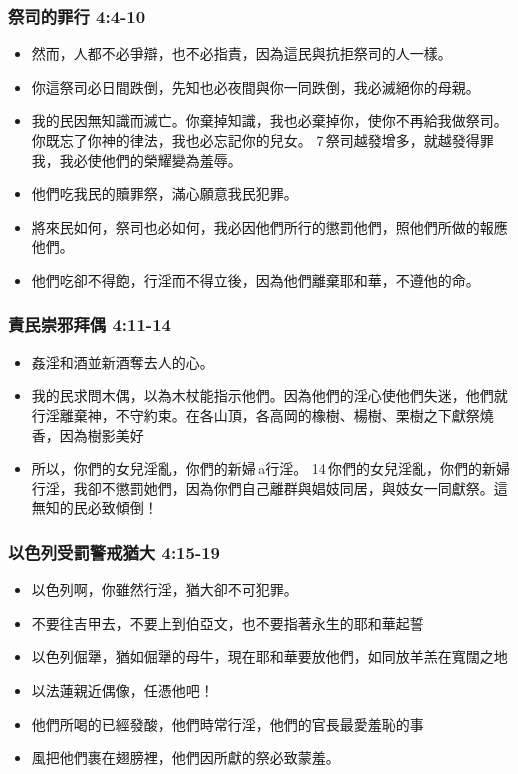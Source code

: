 \subsubsection{祭司的罪行 4:4-10}
\begin{itemize}
\itemsep-.45em  
\item 然而，人都不必爭辯，也不必指責，因為這民與抗拒祭司的人一樣。
\item 你這祭司必日間跌倒，先知也必夜間與你一同跌倒，我必滅絕你的母親。
\item 我的民因無知識而滅亡。你棄掉知識，我也必棄掉你，使你不再給我做祭司。你既忘了你神的律法，我也必忘記你的兒女。 7 祭司越發增多，就越發得罪我，我必使他們的榮耀變為羞辱。
\item 他們吃我民的贖罪祭，滿心願意我民犯罪。
\item 將來民如何，祭司也必如何，我必因他們所行的懲罰他們，照他們所做的報應他們。
\item 他們吃卻不得飽，行淫而不得立後，因為他們離棄耶和華，不遵他的命。
\end{itemize}

\subsubsection{責民崇邪拜偶 4:11-14}
\begin{itemize}
\itemsep-.45em  
\item 姦淫和酒並新酒奪去人的心。
\item 我的民求問木偶，以為木杖能指示他們。因為他們的淫心使他們失迷，他們就行淫離棄神，不守約束。在各山頂，各高岡的橡樹、楊樹、栗樹之下獻祭燒香，因為樹影美好
\item 所以，你們的女兒淫亂，你們的新婦 a行淫。 14 你們的女兒淫亂，你們的新婦行淫，我卻不懲罰她們，因為你們自己離群與娼妓同居，與妓女一同獻祭。這無知的民必致傾倒！
\end{itemize}

\subsubsection{以色列受罰警戒猶大 4:15-19}
\begin{itemize}
\itemsep-.45em  
\item 以色列啊，你雖然行淫，猶大卻不可犯罪。
\item 不要往吉甲去，不要上到伯亞文，也不要指著永生的耶和華起誓
\item 以色列倔犟，猶如倔犟的母牛，現在耶和華要放他們，如同放羊羔在寬闊之地
\item 以法蓮親近偶像，任憑他吧！
\item 他們所喝的已經發酸，他們時常行淫，他們的官長最愛羞恥的事
\item 風把他們裹在翅膀裡，他們因所獻的祭必致蒙羞。
\end{itemize}

